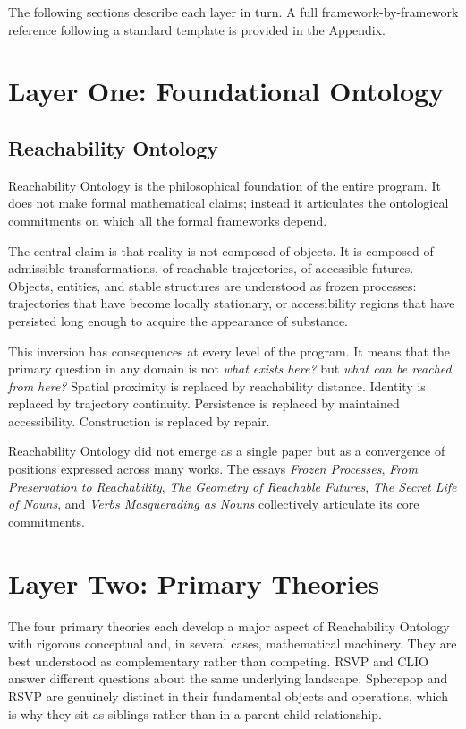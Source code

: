 \documentclass[12pt, twoside]{article}
\begin{document}
\bigskip

The following sections describe each layer in turn. A full framework-by-framework reference following a standard template is provided in the Appendix.

\section{Layer One: Foundational Ontology}

\subsection{Reachability Ontology}

Reachability Ontology is the philosophical foundation of the entire program.
It does not make formal mathematical claims; instead it articulates the
ontological commitments on which all the formal frameworks depend.

The central claim is that reality is not composed of objects. It is composed
of admissible transformations, of reachable trajectories, of accessible
futures. Objects, entities, and stable structures are understood as frozen
processes: trajectories that have become locally stationary, or accessibility
regions that have persisted long enough to acquire the appearance of
substance.

This inversion has consequences at every level of the program. It means that
the primary question in any domain is not \emph{what exists here?} but
\emph{what can be reached from here?} Spatial proximity is replaced by
reachability distance. Identity is replaced by trajectory continuity.
Persistence is replaced by maintained accessibility. Construction is replaced
by repair.

Reachability Ontology did not emerge as a single paper but as a convergence
of positions expressed across many works. The essays \emph{Frozen Processes},
\emph{From Preservation to Reachability}, \emph{The Geometry of Reachable
Futures}, \emph{The Secret Life of Nouns}, and \emph{Verbs Masquerading as
Nouns} collectively articulate its core commitments.

\section{Layer Two: Primary Theories}

The four primary theories each develop a major aspect of Reachability
Ontology with rigorous conceptual and, in several cases, mathematical
machinery. They are best understood as complementary rather than competing.
RSVP and CLIO answer different questions about the same underlying landscape.
Spherepop and RSVP are genuinely distinct in their fundamental objects and
operations, which is why they sit as siblings rather than in a parent-child
relationship.
\end{document}
